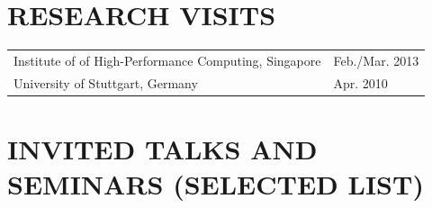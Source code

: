 \documentclass[paper=letter,fontsize=11pt]{scrartcl} %
\newcommand{\NewPart}[2]{\section*{\uppercase{#1} #2}}
\begin{document}
\NewPart{Research Visits}{}

  \begin{tabular}{p{12cm}l}
    Institute of of High-Performance Computing, Singapore & Feb./Mar. 2013 \\
    University of Stuttgart, Germany & Apr. 2010 \\
  \end{tabular}

%
%

\NewPart{Invited Talks and Seminars (selected list)}{}
\end{document}
